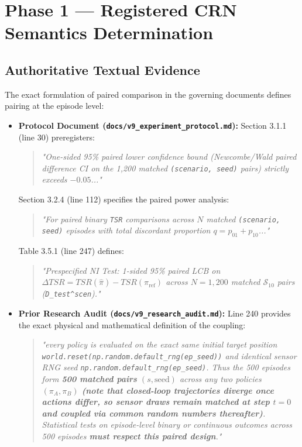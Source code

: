 \documentclass[10pt,a4paper]{article}
\begin{document}
\section{Phase 1 — Registered CRN Semantics Determination}

\subsection{Authoritative Textual Evidence}
The exact formulation of paired comparison in the governing documents defines pairing at the episode level:
\begin{itemize}
    \item \textbf{Protocol Document (\texttt{docs/v9\_experiment\_protocol.md}):}
    Section 3.1.1 (line 30) preregisters:
    \begin{quote}
    \textit{"One-sided 95\% paired lower confidence bound (Newcombe/Wald paired difference CI on the 1,200 matched \texttt{(scenario, seed)} pairs) strictly exceeds $-0.05$..."}
    \end{quote}
    Section 3.2.4 (line 112) specifies the paired power analysis:
    \begin{quote}
    \textit{"For paired binary \texttt{TSR} comparisons across $N$ matched \texttt{(scenario, seed)} episodes with total discordant proportion $q = p_{01} + p_{10}$..."}
    \end{quote}
    Table 3.5.1 (line 247) defines:
    \begin{quote}
    \textit{"Prespecified NI Test: 1-sided 95\% paired LCB on $\Delta TSR = TSR(\hat{\pi}) - TSR(\pi_{\mathrm{ref}})$ across $N=1,200$ matched $\mathcal{S}_{10}$ pairs (\texttt{D\_test\^{}scen})."}
    \end{quote}
    \item \textbf{Prior Research Audit (\texttt{docs/v9\_research\_audit.md}):}
    Line 240 provides the exact physical and mathematical definition of the coupling:
    \begin{quote}
    \textit{"every policy is evaluated on the exact same initial target position \texttt{world.reset(np.random.default\_rng(ep\_seed))} and identical sensor RNG seed \texttt{np.random.default\_rng(ep\_seed)}. Thus the 500 episodes form \textbf{500 matched pairs} $(s, \text{seed})$ across any two policies $(\pi_A, \pi_B)$ \textbf{(note that closed-loop trajectories diverge once actions differ, so sensor draws remain matched at step $t=0$ and coupled via common random numbers thereafter)}. Statistical tests on episode-level binary or continuous outcomes across 500 episodes \textbf{must respect this paired design}."}
    \end{quote}
\end{itemize}
\end{document}
